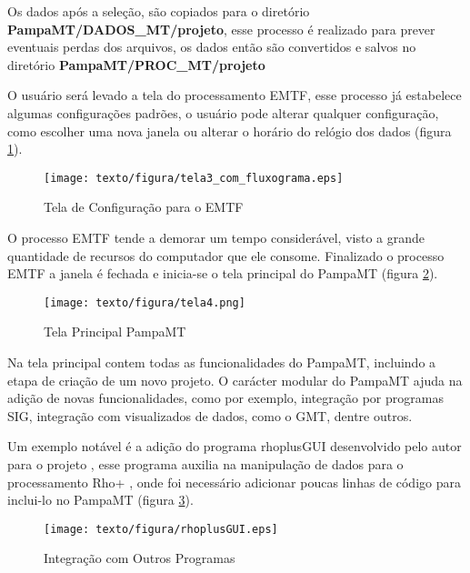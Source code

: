    Os dados após a seleção, são copiados para o diretório \textbf{PampaMT/DADOS\_MT/projeto}, esse processo é realizado para prever eventuais perdas dos arquivos, os dados então são convertidos e salvos no diretório \textbf{PampaMT/PROC\_MT/projeto} 
    
    O usuário será levado a tela do processamento EMTF, esse processo já estabelece algumas configurações padrões, o usuário pode alterar qualquer configuração, como escolher uma nova janela ou alterar o horário do relógio dos dados (figura \ref{conf-procZ}).
    
    \begin{figure}[H]
        \caption{Tela de Configuração para o EMTF}
            \begin{center}
                \texttt{[image: texto/figura/tela3\_com\_fluxograma.eps]}
            \end{center}
        \label{conf-procZ}
    \end{figure}
    
    O processo EMTF tende a demorar um tempo considerável, visto a grande quantidade de recursos do computador que ele consome. Finalizado o processo EMTF a janela é fechada e inicia-se o tela principal do PampaMT (figura \ref{tela-prin}).
    
    \begin{figure}[H]
        \caption{Tela Principal PampaMT}
            \begin{center}
                \texttt{[image: texto/figura/tela4.png]}
            \end{center}
        \label{tela-prin}
    \end{figure}
    
    
    Na tela principal contem todas as funcionalidades do PampaMT, incluindo a etapa de criação de um novo projeto. O carácter modular do PampaMT ajuda na adição de novas funcionalidades, como por exemplo, integração por programas SIG, integração com visualizados de dados, como o GMT, dentre outros.
    
    Um exemplo notável é a adição do programa rhoplusGUI desenvolvido pelo autor para o projeto , esse programa auxilia na manipulação de dados para o processamento Rho+ \cite{parker1996optimal}, onde foi necessário adicionar poucas linhas de código para inclui-lo no PampaMT (figura \ref{rhoplusGUI}).
    
    \begin{figure}[H]
        \caption{Integração com Outros Programas}
            \begin{center}
                \texttt{[image: texto/figura/rhoplusGUI.eps]}
            \end{center}
        \label{rhoplusGUI}
    \end{figure}
    
